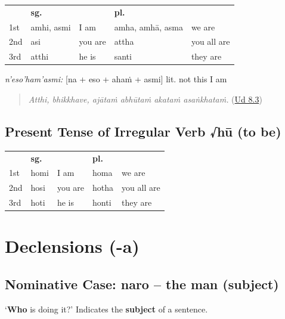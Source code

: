 \documentclass[11pt,oneside]{memoir}
\begin{document}
\begin{center}
\begin{tabular}{lllll}
 & \textbf{sg.} &  & \textbf{pl.} & \\[0pt]
1st & amhi, asmi & I am & amha, amhā, asma & we are\\[0pt]
2nd & asi & you are & attha & you all are\\[0pt]
3rd & atthi & he is & santi & they are\\[0pt]
\end{tabular}
\end{center}

\bigskip

\emph{n'eso'ham'asmi:} [na + eso + ahaṁ + asmi] lit. not this I am

\begin{quote}
\emph{Atthi, bhikkhave, ajātaṁ abhūtaṁ akataṁ asaṅkhataṁ.} (\href{https://suttacentral.net/ud8.3/pli/ms}{Ud 8.3})

\end{quote}

\subsection{Present Tense of Irregular Verb √hū (to be)}
\label{sec:orgf312bb0}

\begin{center}
\begin{tabular}{lllll}
 & \textbf{sg.} &  & \textbf{pl.} & \\[0pt]
1st & homi & I am & homa & we are\\[0pt]
2nd & hosi & you are & hotha & you all are\\[0pt]
3rd & hoti & he is & honti & they are\\[0pt]
\end{tabular}
\end{center}

\section{Declensions (-a)}
\label{sec:orgc073f03}
\subsection{Nominative Case: naro -- the man (subject)}
\label{sec:org6e8f2f9}

`\textbf{Who} is doing it?' Indicates the \textbf{subject} of a sentence.
\end{document}

